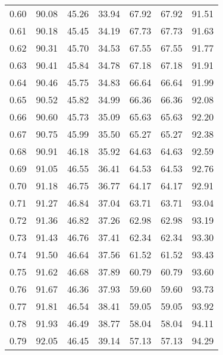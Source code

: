 \begin{tabular}{|c|c|c|c|c|c|c|}
      0.60 &     90.08 &     45.26 &      33.94 &   67.92 &      67.92 &         91.51 \\
      0.61 &     90.18 &     45.45 &      34.19 &   67.73 &      67.73 &         91.63 \\
      0.62 &     90.31 &     45.70 &      34.53 &   67.55 &      67.55 &         91.77 \\
      0.63 &     90.41 &     45.84 &      34.78 &   67.18 &      67.18 &         91.91 \\
      0.64 &     90.46 &     45.75 &      34.83 &   66.64 &      66.64 &         91.99 \\
      0.65 &     90.52 &     45.82 &      34.99 &   66.36 &      66.36 &         92.08 \\
      0.66 &     90.60 &     45.73 &      35.09 &   65.63 &      65.63 &         92.20 \\
      0.67 &     90.75 &     45.99 &      35.50 &   65.27 &      65.27 &         92.38 \\
      0.68 &     90.91 &     46.18 &      35.92 &   64.63 &      64.63 &         92.59 \\
      0.69 &     91.05 &     46.55 &      36.41 &   64.53 &      64.53 &         92.76 \\
      0.70 &     91.18 &     46.75 &      36.77 &   64.17 &      64.17 &         92.91 \\
      0.71 &     91.27 &     46.84 &      37.04 &   63.71 &      63.71 &         93.04 \\
      0.72 &     91.36 &     46.82 &      37.26 &   62.98 &      62.98 &         93.19 \\
      0.73 &     91.43 &     46.76 &      37.41 &   62.34 &      62.34 &         93.30 \\
      0.74 &     91.50 &     46.64 &      37.56 &   61.52 &      61.52 &         93.43 \\
      0.75 &     91.62 &     46.68 &      37.89 &   60.79 &      60.79 &         93.60 \\
      0.76 &     91.67 &     46.36 &      37.93 &   59.60 &      59.60 &         93.73 \\
      0.77 &     91.81 &     46.54 &      38.41 &   59.05 &      59.05 &         93.92 \\
      0.78 &     91.93 &     46.49 &      38.77 &   58.04 &      58.04 &         94.11 \\
      0.79 &     92.05 &     46.45 &      39.14 &   57.13 &      57.13 &         94.29 \\

\end{tabular}
